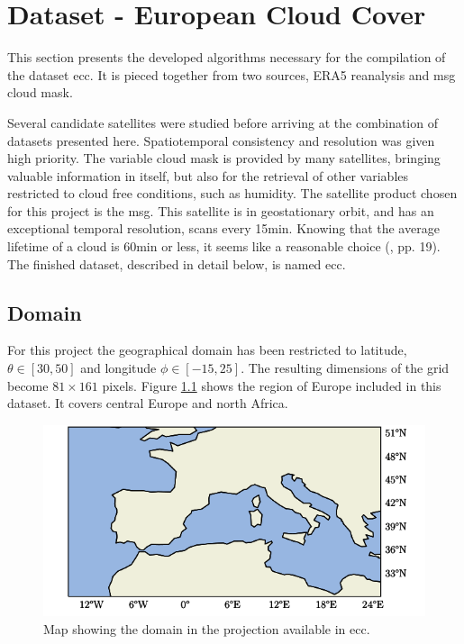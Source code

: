 \chapter{Dataset - European Cloud Cover }
This section presents the developed algorithms necessary for the compilation of the dataset \acrfull{ecc}. It is pieced together from two sources, ERA5 reanalysis and \acrlong{msg} cloud mask.

Several candidate satellites were studied before arriving at the combination of datasets presented here. Spatiotemporal consistency and resolution was given high priority. 
The variable cloud mask is provided by many satellites, bringing valuable information in itself, but also for the retrieval of other variables restricted to cloud free conditions, such as humidity. The satellite product chosen for this project is the \acrfull{msg}. This satellite is in geostationary orbit, and has an exceptional temporal resolution, scans every 15min. Knowing that the average lifetime of a cloud is 60min or less, it seems like a reasonable choice (\cite{lohmann2016}, pp. 19). The finished dataset, described in detail below, is named \acrfull{ecc}.

\section{Domain}
For this project the geographical domain has been restricted to latitude, $\theta \in[30,50]$ and longitude $\phi \in [-15, 25]$. The resulting dimensions of the grid become $81\times161$ pixels. Figure \ref{fig:map} shows the region of Europe included in this dataset. It covers central Europe and north Africa.
\begin{figure}[h]
    \centering
    \includegraphics[scale = 1.0]{python_figs/Domain.png}
    \caption[Map over domain.]{Map showing the domain in the projection available in \acrshort{ecc}.}
    \label{fig:map}
\end{figure}

